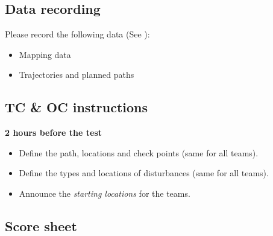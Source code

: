\subsection{Data recording}
Please record the following data (See ):
\begin{itemize}
\item Mapping data
\item Trajectories and planned paths
\end{itemize}


\subsection{TC \& OC instructions}

\textbf{2 hours before the test}
\begin{itemize}
\item Define the path, locations and check points (same for all teams).
\item Define the types and locations of disturbances (same for all teams).
\item Announce the \emph{starting locations} for the teams.
\end{itemize}

\newpage

\subsection{Score sheet}


